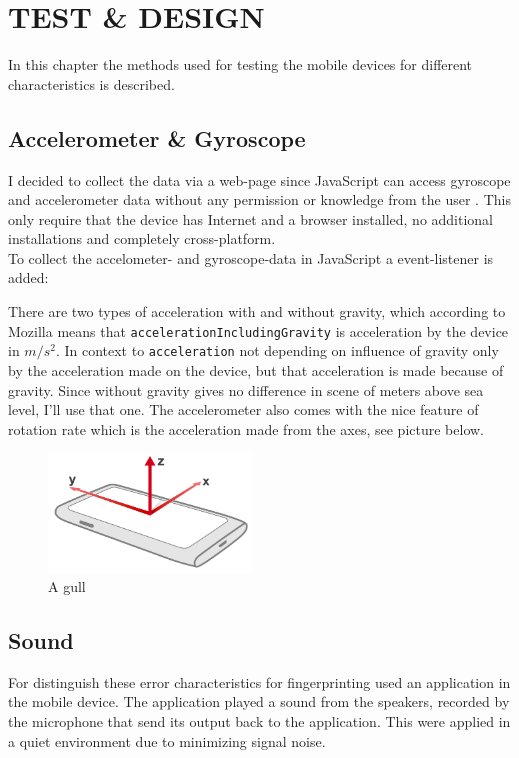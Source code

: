 \chapter{TEST \& DESIGN}\label{cha:test}
In this chapter the methods used for testing the mobile devices for different characteristics is described. 

\section{Accelerometer \& Gyroscope}\label{sec:test:motion}
I decided to collect the data via a web-page since JavaScript can access gyroscope and accelerometer data without any permission or knowledge from the user \cite{sensor:DeviceOrientation:spec}. This only require that the device has Internet and a browser installed, no additional installations and completely cross-platform. \\
To collect the accelometer- and gyroscope-data in JavaScript a event-listener is added:

There are two types of acceleration with and without gravity, which according to Mozilla means that \texttt{accelerationIncludingGravity} is acceleration by the device in $m/s^2$. In context to \texttt{acceleration} not depending on influence of gravity only by the acceleration made on the device, but that acceleration is made because of gravity. Since without gravity gives no difference in scene of meters above sea level, I'll use that one. The accelerometer also comes with the nice feature of rotation rate which is the acceleration made from the axes, see picture below.
\begin{figure}
  \begin{center}
    \includegraphics[width=0.48\textwidth]{img/device-axes}
  \end{center}
  \caption{A gull}
\end{figure}

\cite{sensor:accIncludingGravity}

\section{Sound}\label{sec:test:sound}
For distinguish these error characteristics for fingerprinting \cite{sensor:micSpek} used an application in the mobile device. The application played a sound from the speakers, recorded by the microphone that send its output back to the application. This were applied in a quiet environment due to minimizing signal noise.


